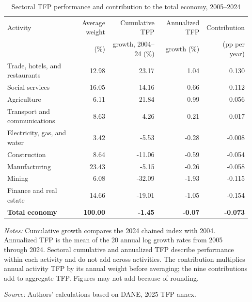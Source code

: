 \begin{table}[H]
\centering
\caption{Sectoral TFP performance and contribution to the total economy, 2005--2024}
\label{tab:paper_long_run}
\footnotesize
\setlength{\tabcolsep}{3pt}
\begin{tabular}{p{4.3cm}rrrr}
\toprule
Activity & Average weight & Cumulative TFP & Annualized TFP & Contribution \\
 & (\%) & growth, 2004--24 (\%) & growth (\%) & (pp per year) \\
\midrule
Trade, hotels, and restaurants & 12.98 & 23.17 & 1.04 & 0.130 \\
Social services & 16.05 & 14.16 & 0.66 & 0.112 \\
Agriculture & 6.11 & 21.84 & 0.99 & 0.056 \\
Transport and communications & 8.63 & 4.26 & 0.21 & 0.017 \\
Electricity, gas, and water & 3.42 & -5.53 & -0.28 & -0.008 \\
Construction & 8.64 & -11.06 & -0.59 & -0.054 \\
Manufacturing & 23.43 & -5.15 & -0.26 & -0.058 \\
Mining & 6.08 & -32.09 & -1.93 & -0.115 \\
Finance and real estate & 14.66 & -19.01 & -1.05 & -0.154 \\
\midrule
\textbf{Total economy} & \textbf{100.00} & \textbf{-1.45} & \textbf{-0.07} & \textbf{-0.073} \\
\bottomrule
\end{tabular}
\vspace{0.15cm}
\begin{minipage}{0.96\textwidth}
\footnotesize \textit{Notes:} Cumulative growth compares the 2024 chained index with 2004. Annualized TFP is the mean of the 20 annual log growth rates from 2005 through 2024. Sectoral cumulative and annualized TFP describe performance within each activity and do not add across activities. The contribution multiplies annual activity TFP by its annual weight before averaging; the nine contributions add to aggregate TFP. Figures may not add because of rounding.
\par\textit{Source:} Authors' calculations based on DANE, 2025 TFP annex.
\end{minipage}
\end{table}
